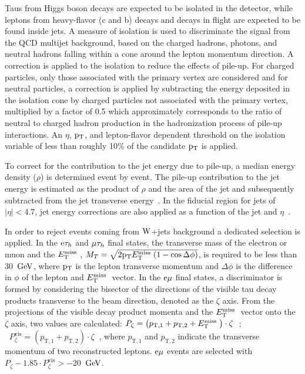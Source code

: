 Taus from Higgs boson decays are expected to be isolated in the detector, while leptons from 
heavy-flavor (c and b) decays and decays in flight are expected to be found inside jets. A 
measure of isolation is used to discriminate the signal from the QCD multijet background, 
based on the charged hadrons, photons, and neutral hadrons falling within a cone around the 
lepton momentum direction.
A correction is applied to the isolation to reduce the effects of pile-up. For charged particles, 
only those associated with the primary vertex are considered and for neutral particles, a 
correction is applied by subtracting the energy deposited in the isolation cone by charged 
particles not associated with the primary vertex, multiplied by a factor of 0.5 which 
approximately corresponds to the ratio of neutral to charged hadron production in the 
hadronization process of pile-up interactions. An $\eta$, $\mathrm{p_{T}}$, and lepton-flavor dependent 
threshold on the isolation variable of less than roughly 10\% of the candidate $\mathrm{p_{T}}$ is applied.

To correct for the contribution to the jet energy due to pile-up, a median energy density ($\rho$) is determined event by event. The pile-up contribution to the jet energy is estimated as the product of $\rho$ and the area of the jet and subsequently subtracted from the jet transverse energy~\cite{Cacciari:subtraction}. In the fiducial region for jets of $|\eta| < 4.7$, jet energy corrections are also applied as a function of the jet \ET and $\eta$~\cite{cmsJEC}.


In order to reject events coming from $\mathrm{W}$+jets background a dedicated selection is applied. 
In the $\mathrm{e}\mathrm{\tau}_h$ and $\mathrm{\mu}\mathrm{\tau}_h$ final states, the transverse mass of the electron 
or muon and the $E_\mathrm{T}^{\mathrm{miss}}\;$, $M_{T} = \sqrt{2 \mathrm{p_{T}} E_\mathrm{T}^{\mathrm{miss}}\; (1-\cos\Delta\phi)}$, is required to 
be less than 30~$\mathrm{GeV}$, where $\mathrm{p_{T}}$ is the lepton transverse momentum and $\Delta\phi$ is the difference in $\phi$ of the lepton and $E_\mathrm{T}^{\mathrm{miss}}\;$ vector. In the $\mathrm{e}\mathrm{\mu}$  final states, a discriminator is formed by considering the bisector of the directions of the visible tau decay products transverse to the beam direction, denoted as the $\zeta$ axis.  From the projections of the visible decay product momenta and the $E_\mathrm{T}^{\mathrm{miss}}\;$ vector onto the $\zeta$ axis, two values are calculated: $ P_{\zeta} = \left( p_\mathrm{T,1} + p_\mathrm{T,2} + E_\mathrm{T}^{\mathrm{miss}}\; \right) \cdot \zeta\;\;$; $\;\;P_{\zeta}^{\text{vis}} = \left( p_\mathrm{T,1} + p_\mathrm{T,2} \right) \cdot \zeta\;\;$, 
where $p_\mathrm{T, 1}$ and $p_\mathrm{T, 2}$ indicate the transverse momentum
of two reconstructed leptons.  $\mathrm{e}\mathrm{\mu}$ events are selected with $P_\zeta - 1.85 \cdot P_\zeta^{\mathrm{vis}} > -20 $~$\mathrm{GeV}$.



